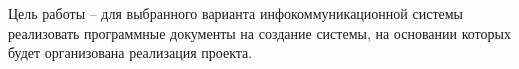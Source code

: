 Цель работы -- для выбранного варианта инфокоммуникационной системы реализовать
программные документы на создание системы, на основании которых будет
организована реализация проекта.
